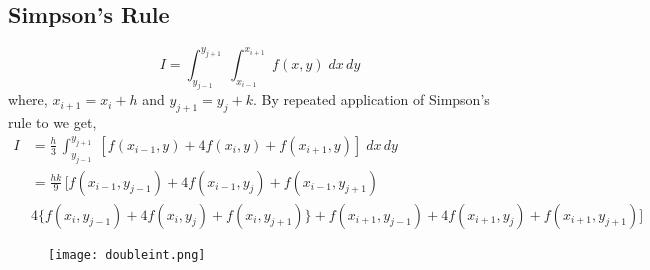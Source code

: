 \documentclass[aima203_lecturenotes_ku.tex]{subfiles}
\begin{document}
\subsection{Simpson's Rule}
\begin{equation*}
  I = \int_{y_{j-1}}^{y_{j+1}}\; \int_{x_{i-1}}^{x_{i+1}} \; f(x,y)\;dx\,dy
\end{equation*}
where, $x_{i+1} = x_i + h$ and $y_{j+1} = y_j + k$.
By repeated application of Simpson's rule to we get,
\begin{equation}
  \label{simpdouble}
  \begin{aligned}
    I &= \frac{h}{3} \,\int_{y_{j-1}}^{y_{j+1}}\; [f(x_{i-1},y) + 4f(x_i,y) + f(x_{i+1},y) ]\;dx\,dy \\[1mm]
      &= \frac{hk}{9} \, [f(x_{i-1},y_{j-1}) + 4f(x_{i-1},y_j) + f(x_{i-1},y_{j+1}) \\[1mm]
    & 4\{f(x_i,y_{j-1}) + 4f(x_i,y_j) + f(x_i,y_{j+1})\} + f(x_{i+1},y_{j-1}) + 4f(x_{i+1},y_j) + f(x_{i+1},y_{j+1})]
  \end{aligned}
\end{equation}
\vspace{1cm}

\begin{figure}[h]
  \centering
\texttt{[image: doubleint.png]}
\end{figure}
\end{document}

